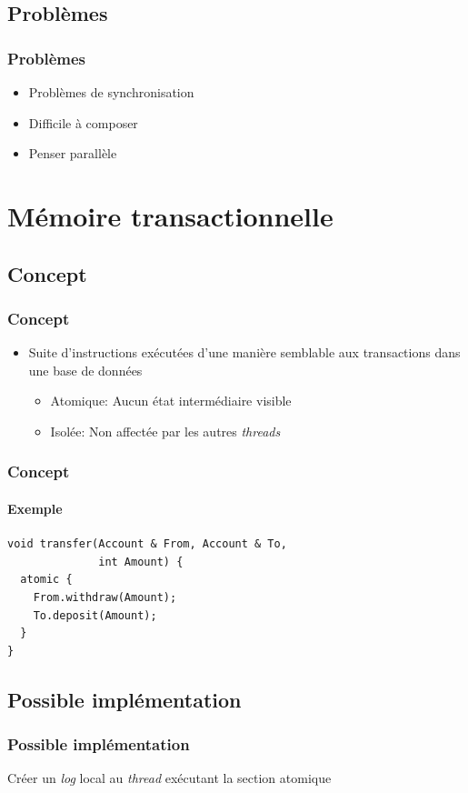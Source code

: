\documentclass{beamer}
\begin{document}
\subsection{Problèmes}
\begin{frame}
\frametitle{Problèmes}
\begin{itemize}
\item Problèmes de synchronisation
\item Difficile à composer
\item Penser parallèle
\end{itemize}
\end{frame}

\section{Mémoire transactionnelle}
\subsection{Concept}
\begin{frame}
\frametitle{Concept}
\begin{itemize}
\item Suite d'instructions exécutées d'une manière semblable aux transactions dans une base de données
\begin{itemize}
\item<2-> Atomique: Aucun état intermédiaire visible
\item<3-> Isolée: Non affectée par les autres \textit{threads}
\end{itemize}
\end{itemize}
\end{frame}

\begin{frame}[fragile]
\frametitle{Concept}
\framesubtitle{Exemple}
\begin{lstlisting}
void transfer(Account & From, Account & To, 
              int Amount) {
  atomic {
    From.withdraw(Amount);
    To.deposit(Amount);
  }
}
\end{lstlisting}
\end{frame}

\subsection{Possible implémentation}
\begin{frame}
\frametitle{Possible implémentation}
\begin{algorithm}[H]
 Créer un \textit{log} local au \textit{thread} exécutant la section atomique\;
\end{algorithm}
\end{frame}
\end{document}
